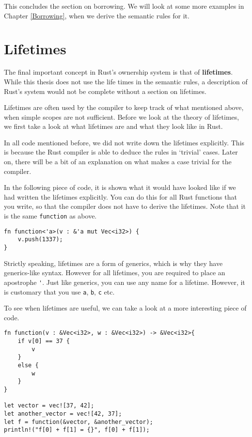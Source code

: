 This concludes the section on borrowing. We will look at some more examples in Chapter \ref{Borrowing}, when we derive the semantic rules for it. 

\section{Lifetimes}
The final important concept in Rust's ownership system is that of \textbf{lifetimes}. While this thesis does not use the life times in the semantic rules, a description of Rust's system would not be complete without a section on lifetimes. 

Lifetimes are often used by the compiler to keep track of what mentioned above, when simple scopes are not sufficient. Before we look at the theory of lifetimes, we first take a look at what lifetimes are and what they look like in Rust.
 
In all code mentioned before, we did not write down the lifetimes explicitly. This is because the Rust compiler is able to deduce the rules in `trivial' cases. Later on, there will be a bit of an explanation on what makes a case trivial for the compiler.

In the following piece of code, it is shown what it would have looked like if we had written the lifetimes explicitly. You can do this for all Rust functions that you write, so that the compiler does not have to derive the lifetimes. Note that it is the same \verb|function| as above. 

\begin{verbatim}
fn function<'a>(v : &'a mut Vec<i32>) {
    v.push(1337);
}
\end{verbatim}

Strictly speaking, lifetimes are a form of generics, which is why they have generics-like syntax.  However for all lifetimes, you are required to place an apostrophe \verb|'|. Just like generics, you can use any name for a lifetime. However, it is customary that you use \verb|a|, \verb|b|, \verb|c| etc. 

To see when lifetimes are useful, we can take a look at a more interesting piece of code. 

\begin{verbatim}
fn function(v : &Vec<i32>, w : &Vec<i32>) -> &Vec<i32>{
    if v[0] == 37 {
        v
    }
    else {
        w
    }
}

let vector = vec![37, 42];
let another_vector = vec![42, 37];
let f = function(&vector, &another_vector);
println!("f[0] + f[1] = {}", f[0] + f[1]);
\end{verbatim}

